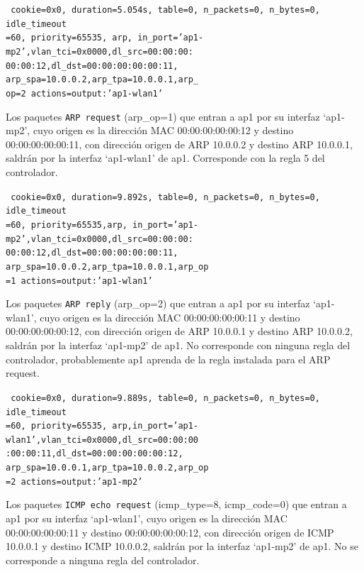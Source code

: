 \documentclass[a4paper,12pt,twoside,spanish]{book}
\begin{document}
\noindent\texttt{
	cookie=0x0, duration=5.054s, table=0, n\_packets=0, n\_bytes=0, idle\_timeout\\
	=60, priority=65535, arp,
	in\_port='ap1-mp2',vlan\_tci=0x0000,dl\_src=00:00:00:\\
	00:00:12,dl\_dst=00:00:00:00:00:11,
	arp\_spa=10.0.0.2,arp\_tpa=10.0.0.1,arp\_\\
	op=2 actions=output:'ap1-wlan1'
}

Los paquetes \texttt{ARP request} (arp\_op=1) que entran a ap1 por su interfaz ‘ap1-mp2’, cuyo origen es la dirección MAC 00:00:00:00:00:12 y destino 00:00:00:00:00:11, con dirección origen de ARP 10.0.0.2 y destino ARP 10.0.0.1, saldrán por la interfaz ‘ap1-wlan1’ de ap1. Corresponde con la regla 5 del controlador.\par 

\noindent\texttt{
	cookie=0x0, duration=9.892s, table=0, n\_packets=0, n\_bytes=0, idle\_timeout\\
	=60, priority=65535,arp,
	in\_port='ap1-mp2',vlan\_tci=0x0000,dl\_src=00:00:00:\\
	00:00:12,dl\_dst=00:00:00:00:00:11,
	arp\_spa=10.0.0.2,arp\_tpa=10.0.0.1,arp\_op\\
	=1 actions=output:'ap1-wlan1'
}

Los paquetes \texttt{ARP reply} (arp\_op=2) que entran a ap1 por su interfaz ‘ap1-wlan1’, cuyo origen es la dirección MAC 00:00:00:00:00:11 y destino 00:00:00:00:00:12, con dirección origen de ARP 10.0.0.1 y destino ARP 10.0.0.2, saldrán por la interfaz ‘ap1-mp2’ de ap1. No corresponde con ninguna regla del controlador, probablemente ap1 aprenda de la regla instalada para el ARP request.\par 

\noindent\texttt{
	cookie=0x0, duration=9.889s, table=0, n\_packets=0, n\_bytes=0, idle\_timeout\\
	=60, priority=65535,
	arp,in\_port='ap1-wlan1',vlan\_tci=0x0000,dl\_src=00:00:00\\
	:00:00:11,dl\_dst=00:00:00:00:00:12,
	arp\_spa=10.0.0.1,arp\_tpa=10.0.0.2,arp\_op\\
	=2 actions=output:'ap1-mp2'
}

Los paquetes \texttt{ICMP echo request} (icmp\_type=8, icmp\_code=0) que entran a ap1 por su interfaz ‘ap1-wlan1’, cuyo origen es la dirección MAC 00:00:00:00:00:11 y destino 00:00:00:00:00:12, con dirección origen de ICMP 10.0.0.1 y destino ICMP 10.0.0.2, saldrán por la interfaz ‘ap1-mp2’ de ap1. No se corresponde a ninguna regla del controlador.\par 
\end{document}
